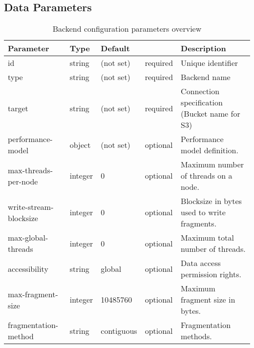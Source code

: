 

\subsection{Data Parameters}

\begin{preserve}
\begin{table}[!h]
  \begin{center}
    \begin{scriptsize}
      \begin{tabularx}{\textwidth}{llllX}
        Parameter              & Type    & Default    &          & Description \\
        \hline
        id                     & string  & (not set)  & required & Unique identifier \\
        type                   & string  & (not set)  & required & Backend name \\
        target                 & string  & (not set)  & required & Connection specification (Bucket name for S3) \\
        performance-model      & object  & (not set)  & optional & Performance model definition.\\
        max-threads-per-node   & integer & 0          & optional & Maximum number of threads on a node. \\
        write-stream-blocksize & integer & 0          & optional & Blocksize in bytes used to write fragments. \\
        max-global-threads     & integer & 0          & optional & Maximum total number of threads. \\
        accessibility          & string  & global     & optional & Data access permission rights. \\
        max-fragment-size      & integer & 10485760   & optional & Maximum fragment size in bytes. \\
        fragmentation-method   & string  & contiguous & optional & Fragmentation methods.\\
      \end{tabularx}
    \end{scriptsize}
  \end{center}
  \caption{Backend configuration parameters overview}%
  \label{tab:backend_conf_params}
\end{table}
\end{preserve}

\begin{preserve}
\def\gapsize{1cm}
\end{preserve}
\def\gapsize{1cm}


